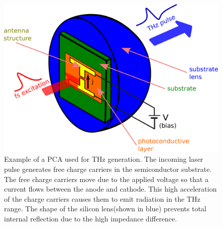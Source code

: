 \begin{figure}[H]
    \centering
    \includegraphics[scale=0.5]{images/2_chapter02/PCA.png}
    \caption{Example of a PCA used for THz generation. The incoming laser pulse generates free charge carriers in the semiconductor substrate. The free charge carriers move due to the applied voltage so that a current flows between the anode and cathode. This high acceleration of the charge carriers causes them to emit radiation in the THz range. The shape of the silicon lens(shown in blue) prevents total internal reflection due to the high impedance difference.}
    \label{fig:PCA}
\end{figure}

